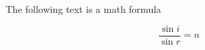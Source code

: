 \documentclass{article}
\begin{document}
\begin{titlepage}
\maketitle
\end{titlepage}

The following text is a math formula

\begin{equation}
  \frac{\sin{i}}{\sin{r}} = n
\end{equation}

\end{document}
